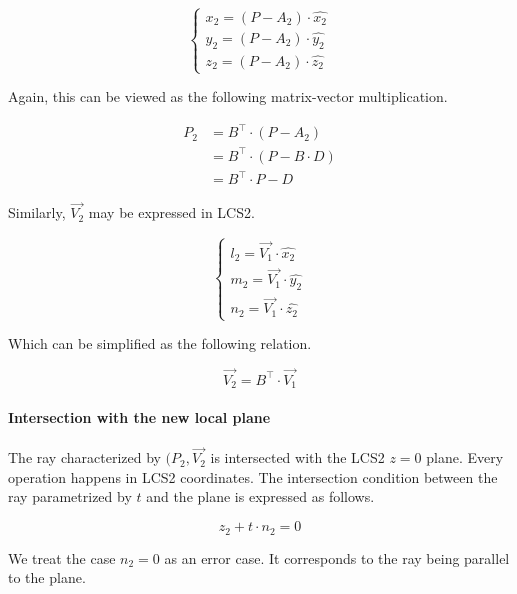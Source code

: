 \begin{equation} \begin{cases}
x_2 = (P - A_2) \cdot \hat{x_2} \\
y_2 = (P - A_2) \cdot \hat{y_2} \\
z_2 = (P - A_2) \cdot \hat{z_2}
\end{cases} \end{equation}

Again, this can be viewed as the following matrix-vector multiplication.

\begin{equation} \begin{split}
P_2 &= B^\top \cdot (P - A_2) \\
    &= B^\top \cdot (P - B \cdot D) \\
    &= B^\top \cdot P - D
\end{split} \end{equation}

Similarly, $\overrightarrow{V_2}$ may be expressed in LCS2.

\begin{equation} \begin{cases}
l_2 = \overrightarrow{V_1} \cdot \hat{x_2} \\
m_2 = \overrightarrow{V_1} \cdot \hat{y_2} \\
n_2 = \overrightarrow{V_1} \cdot \hat{z_2}
\end{cases} \end{equation}

Which can be simplified as the following relation.

\begin{equation}
\overrightarrow{V_2} = B^\top \cdot \overrightarrow{V_1}
\end{equation}

\paragraph{Intersection with the new local plane}
The ray characterized by $(P_2, \overrightarrow{V_2}$ is intersected
with the LCS2 $z = 0$ plane. Every operation happens in LCS2 coordinates.
The intersection condition between the ray parametrized by $t$ and the
plane is expressed as follows.

\begin{equation}
z_2 + t \cdot n_2 = 0
\end{equation}

We treat the case $n_2 = 0$ as an error case. It corresponds to the ray
being parallel to the plane.

